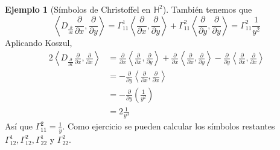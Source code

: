 \documentclass[spanish]{book}
\theoremstyle{definition}
\newtheorem*{ejem}{Ejemplo}
\newcommand{\Hy}{\mathbb{H}}
\begin{document}
\begin{ejem}[Símbolos de Christoffel en $\Hy^2$]
		También tenemos que
		\[\left\langle D_{\frac{\partial}{\partial x}}\frac{\partial}{\partial x},\frac{\partial}{\partial y}\right\rangle=\Gamma_{11}^1\left\langle \frac{\partial}{\partial x},\frac{\partial}{\partial y}\right\rangle+\Gamma_{11}^2\left\langle \frac{\partial}{\partial y},\frac{\partial}{\partial y}\right\rangle=\Gamma_{11}^2\frac{1}{y^2}\]
		Aplicando Koszul,
			\begin{align*}
			2\left\langle D_{\frac{\partial}{\partial x}}\frac{\partial}{\partial x},\frac{\partial}{\partial x}\right\rangle&=\frac{\partial}{\partial x}\left\langle \frac{\partial}{\partial x},\frac{\partial}{\partial y}\right\rangle+\frac{\partial}{\partial x}\left\langle \frac{\partial}{\partial x},\frac{\partial}{\partial y}\right\rangle-\frac{\partial}{\partial y}\left\langle \frac{\partial}{\partial x},\frac{\partial}{\partial x}\right\rangle\\
			&=-\frac{\partial}{\partial y}\left\langle \frac{\partial}{\partial x},\frac{\partial}{\partial x}\right\rangle\\
			&=-\frac{\partial}{\partial y}\left(\frac{1}{y^2}\right)\\
			&=2\frac{1}{y^3}
			\end{align*}
		Así que $\Gamma_{11}^2=\frac{1}{y}$.
		Como ejercicio se pueden calcular los símbolos restantes $\Gamma^1_{12},\Gamma^2_{12},\Gamma^1_{22}$ y $\Gamma^2_{22}$.
	\end{ejem}
	
\end{document}
